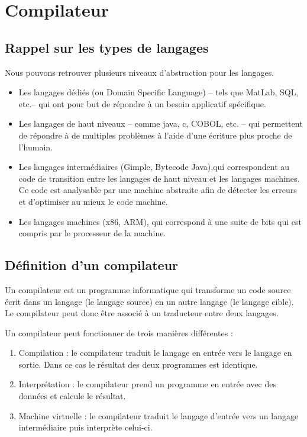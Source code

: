 \documentclass[12pt, twoside, openright]{report}
\begin{document}
\section{Compilateur}

\subsection{Rappel sur les types de langages}

Nous pouvons retrouver plusieurs niveaux d'abstraction pour les langages.\cite{compilateur01}
\begin{itemize}
    \item Les langages dédiés (ou Domain Specific Language) -- tels que MatLab, SQL, etc.-- qui ont pour but de répondre à un besoin applicatif spécifique. 
    \item Les langages de haut niveaux -- comme java, c, COBOL, etc. -- qui permettent de répondre à de multiples problèmes à l'aide d'une écriture plus proche de l'humain.
    \item Les langages intermédiaires (Gimple, Bytecode Java),qui correspondent au code de transition entre les langages de haut niveau et les langages machines. Ce code est analysable par une machine abstraite afin de détecter les erreurs et d'optimiser au mieux le code machine.
    \item Les langages machines (x86, ARM), qui correspond à une suite de bits qui est compris par le processeur de la machine.
\end{itemize}

\subsection{Définition d'un compilateur}

Un compilateur est un programme informatique qui transforme un code source écrit dans un langage (le langage source) en un autre langage (le langage cible). \cite{compilateur02} Le compilateur peut donc être associé à un traducteur entre deux langages. \cite{compilateur01}

Un compilateur peut fonctionner de trois manières différentes : 
\begin{enumerate}
    \item Compilation : le compilateur traduit le langage en entrée vers le langage en sortie. Dans ce cas le résultat des deux programmes est identique.
    \item Interprétation : le compilateur prend un programme en entrée avec des données et calcule le résultat.
    \item Machine virtuelle : le compilateur traduit le langage d'entrée vers un langage intermédiaire puis interprète celui-ci.
\end{enumerate}
\end{document}
